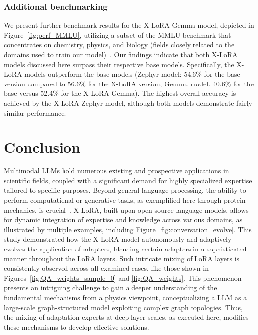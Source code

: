\subsubsection{Additional benchmarking} We present further benchmark results for the X-LoRA-Gemma model, depicted in Figure~\ref{fig:perf_MMLU}, utilizing a subset of the MMLU benchmark that concentrates on chemistry, physics, and biology (fields closely related to the domains used to train our model)~\cite{Hendrycks2020MeasuringUnderstanding}. Our findings indicate that both X-LoRA models discussed here surpass their respective base models. Specifically, the X-LoRA models outperform the base models (Zephyr model: 54.6\% for the base version compared to 56.6\% for the X-LoRA version; Gemma model: 40.6\% for the base versus 52.4\% for the X-LoRA-Gemma). The highest overall accuracy is achieved by the X-LoRA-Zephyr model, although both models demonstrate fairly similar performance.

\section{Conclusion}

Multimodal LLMs hold numerous existing and prospective applications in scientific fields, coupled with a significant demand for highly specialized expertise tailored to specific purposes. Beyond general language processing, the ability to perform computational or generative tasks, as exemplified here through protein mechanics, is crucial~\cite{Luu2023BioinspiredLLM:Materials,Buehler2023MechGPTModalities,Buehler2023MeLMProblemsb}. X-LoRA, built upon open-source language models, allows for dynamic integration of expertise and knowledge across various domains, as illustrated by multiple examples, including Figure~\ref{fig:conversation_evolve}. This study demonstrated how the X-LoRA model autonomously and adaptively evolves the application of adapters, blending certain adapters in a sophisticated manner throughout the LoRA layers. Such intricate mixing of LoRA layers is consistently observed across all examined cases, like those shown in Figures~\ref{fig:QA_weights_sample_0} and \ref{fig:QA_weights}. This phenomenon presents an intriguing challenge to gain a deeper understanding of the fundamental mechanisms from a physics viewpoint, conceptualizing a LLM as a large-scale graph-structured model exploiting complex graph topologies. Thus, the mixing of adaptation experts at deep layer scales, as executed here, modifies these mechanisms to develop effective solutions.

